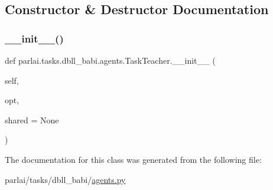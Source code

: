 \subsection{Constructor \& Destructor Documentation}
\mbox{\label{classparlai_1_1tasks_1_1dbll__babi_1_1agents_1_1TaskTeacher_a8e42d5b61c8f9eebccd45c467506077d}} 
\subsubsection{\texorpdfstring{\+\_\+\+\_\+init\+\_\+\+\_\+()}{\_\_init\_\_()}}
{\footnotesize\ttfamily def parlai.\+tasks.\+dbll\+\_\+babi.\+agents.\+Task\+Teacher.\+\_\+\+\_\+init\+\_\+\+\_\+ (\begin{DoxyParamCaption}\item[{}]{self,  }\item[{}]{opt,  }\item[{}]{shared = {\ttfamily None} }\end{DoxyParamCaption})}



The documentation for this class was generated from the following file\+:\begin{DoxyCompactItemize}
\item 
parlai/tasks/dbll\+\_\+babi/\hyperlink{parlai_2tasks_2dbll__babi_2agents_8py}{agents.\+py}\end{DoxyCompactItemize}
